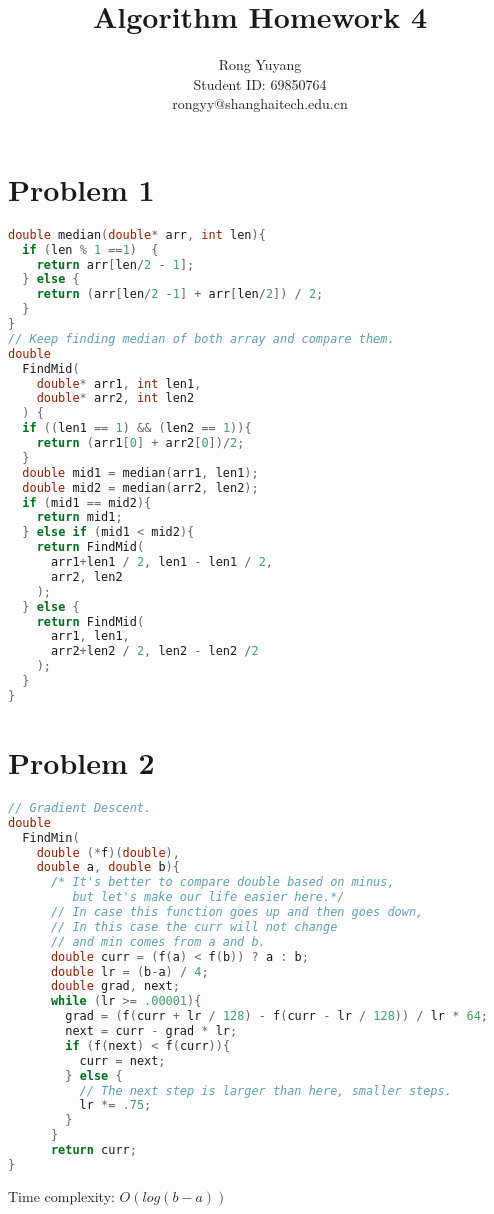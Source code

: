 \documentclass{article}
\title{Algorithm Homework 4}
\author{Rong Yuyang \\ Student ID: 69850764 \\ rongyy@shanghaitech.edu.cn}
\begin{document}
\maketitle

\section*{Problem 1}
\begin{lstlisting}[language = C++]
double median(double* arr, int len){
  if (len % 1 ==1)  {
    return arr[len/2 - 1];
  } else {
    return (arr[len/2 -1] + arr[len/2]) / 2;
  }
}
// Keep finding median of both array and compare them.
double 
  FindMid(
    double* arr1, int len1,
    double* arr2, int len2
  ) {
  if ((len1 == 1) && (len2 == 1)){
    return (arr1[0] + arr2[0])/2;
  }
  double mid1 = median(arr1, len1);
  double mid2 = median(arr2, len2);
  if (mid1 == mid2){
    return mid1;
  } else if (mid1 < mid2){
    return FindMid(
      arr1+len1 / 2, len1 - len1 / 2,
      arr2, len2
    );
  } else {
    return FindMid(
      arr1, len1,
      arr2+len2 / 2, len2 - len2 /2
    );
  }
}
\end{lstlisting}
\section*{Problem 2}
\begin{lstlisting}[language = C++]
// Gradient Descent.
double 
  FindMin(
    double (*f)(double), 
    double a, double b){
      /* It's better to compare double based on minus, 
         but let's make our life easier here.*/
      // In case this function goes up and then goes down, 
      // In this case the curr will not change 
      // and min comes from a and b.
      double curr = (f(a) < f(b)) ? a : b;
      double lr = (b-a) / 4;
      double grad, next;
      while (lr >= .00001){
        grad = (f(curr + lr / 128) - f(curr - lr / 128)) / lr * 64;
        next = curr - grad * lr;
        if (f(next) < f(curr)){
          curr = next;
        } else {
          // The next step is larger than here, smaller steps.
          lr *= .75;
        }
      }
      return curr;
}
\end{lstlisting}
Time complexity: $O(log(b-a))$
\end{document}
